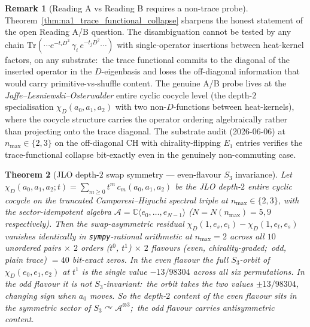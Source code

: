 \documentclass[11pt,a4paper]{article}
\theoremstyle{plain}
\newtheorem{theorem}{Theorem}[section]
\theoremstyle{definition}
\newtheorem{remark}[theorem]{Remark}
\newcommand{\Tr}{\mathrm{Tr}}
\begin{document}
\begin{remark}[Reading A vs Reading B requires a non-trace probe]
\label{rem:reading_AB_jlo_cocycle}
Theorem~\ref{thm:na1_trace_functional_collapse} sharpens the
honest statement of the open Reading A/B question.  The
disambiguation cannot be tested by any chain
$\Tr(\cdots e^{-t_i D^2}\, \gamma_i\, e^{-t_j D^2}\cdots)$ with
single-operator insertions between heat-kernel factors, on any
substrate:\ the trace functional commits to the diagonal of the
inserted operator in the $D$-eigenbasis and loses the
off-diagonal information that would carry primitive-vs-shuffle
content.  The genuine A/B probe lives at the
\emph{Jaffe--Lesniewski--Osterwalder} entire cyclic cocycle level
(the depth-$2$ specialisation
$\chi_D(a_0, a_1, a_2)$ with two non-$D$-functions between
heat-kernels), where the cocycle structure carries the operator
ordering algebraically rather than projecting onto the trace
diagonal.  The substrate audit (2026-06-06) at $n_{\max} \in \{2, 3\}$ on the
off-diagonal CH with chirality-flipping $E_1$ entries
verifies the trace-functional collapse bit-exactly even in the
genuinely non-commuting case.
\end{remark}

\begin{theorem}[JLO depth-$2$ swap symmetry --- even-flavour
$S_3$ invariance]
\label{thm:jlo_depth2_reading_A}
Let $\chi_D(a_0, a_1, a_2; t) = \sum_{m \ge 0} t^m\, c_m(a_0, a_1, a_2)$
be the JLO depth-$2$ entire cyclic cocycle on the truncated
Camporesi--Higuchi spectral triple at $n_{\max} \in \{2, 3\}$, with
the sector-idempotent algebra
$\mathcal{A} = \mathbb{C}\langle e_0, \ldots, e_{N - 1}\rangle$
($N = N(n_{\max}) = 5, 9$ respectively).  Then the swap-asymmetric
residual $\chi_D(1, e_s, e_t) - \chi_D(1, e_t, e_s)$ vanishes identically
in \texttt{sympy}-rational arithmetic at $n_{\max} = 2$ across all $10$
unordered pairs $\times$ $2$ orders ($t^0$, $t^1$) $\times$ $2$ flavours
(even, chirality-graded;\ odd, plain trace) $= 40$ bit-exact zeros.  In
the \emph{even} flavour the full $S_3$-orbit of $\chi_D(e_0, e_1, e_2)$ at
$t^1$ is the single value $-13/98304$ across all six permutations.  In the
\emph{odd} flavour it is not $S_3$-invariant:\ the orbit takes the two
values $\pm 13/98304$, changing sign when $a_0$ moves.  So the depth-$2$
content of the even flavour sits in the symmetric sector of
$S_3 \curvearrowright \mathcal{A}^{\otimes 3}$;\ the odd flavour carries
antisymmetric content.
\end{theorem}
\end{document}
